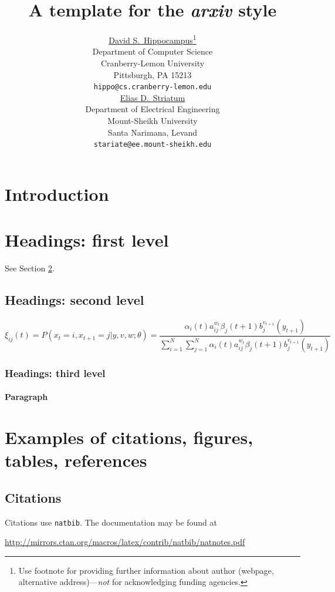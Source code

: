 \documentclass{article}
\title{A template for the \emph{arxiv} style}
\author{ \href{https://orcid.org/0000-0000-0000-0000}{David S.~Hippocampus}\thanks{Use footnote for providing further
		information about author (webpage, alternative
		address)---\emph{not} for acknowledging funding agencies.} \\
	Department of Computer Science\\
	Cranberry-Lemon University\\
	Pittsburgh, PA 15213 \\
	\texttt{hippo@cs.cranberry-lemon.edu} \\
	\And
	\href{https://orcid.org/0000-0000-0000-0000}{Elias D.~Striatum} \\
	Department of Electrical Engineering\\
	Mount-Sheikh University\\
	Santa Narimana, Levand \\
	\texttt{stariate@ee.mount-sheikh.edu} \\
}
\begin{document}
\maketitle

\begin{abstract}
	\lipsum[1]
\end{abstract}




\section{Introduction}
\lipsum[2]
\lipsum[3]


\section{Headings: first level}
\label{sec:headings}

\lipsum[4] See Section \ref{sec:headings}.

\subsection{Headings: second level}
\lipsum[5]
\begin{equation}
	\xi _{ij}(t)=P(x_{t}=i,x_{t+1}=j|y,v,w;\theta)= {\frac {\alpha _{i}(t)a^{w_t}_{ij}\beta _{j}(t+1)b^{v_{t+1}}_{j}(y_{t+1})}{\sum _{i=1}^{N} \sum _{j=1}^{N} \alpha _{i}(t)a^{w_t}_{ij}\beta _{j}(t+1)b^{v_{t+1}}_{j}(y_{t+1})}}
\end{equation}

\subsubsection{Headings: third level}
\lipsum[6]

\paragraph{Paragraph}
\lipsum[7]



\section{Examples of citations, figures, tables, references}
\label{sec:others}

\subsection{Citations}
Citations use \verb+natbib+. The documentation may be found at
\begin{center}
	\url{http://mirrors.ctan.org/macros/latex/contrib/natbib/natnotes.pdf}
\end{center}
\end{document}
